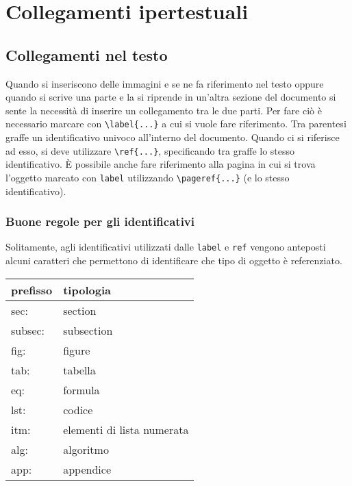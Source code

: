 \section{Collegamenti ipertestuali}

\subsection{Collegamenti nel testo}
Quando si inseriscono delle immagini e se ne fa riferimento nel testo oppure quando si scrive una parte e la si riprende in un'altra sezione del documento si sente la necessità di inserire un collegamento tra le due parti. Per fare ciò è necessario marcare con \verb!\label{...}! a cui si vuole fare riferimento. Tra parentesi graffe un identificativo univoco all'interno del documento. Quando ci si riferisce ad esso, si deve utilizzare \verb!\ref{...}!, specificando tra graffe lo stesso identificativo. È possibile anche fare riferimento alla pagina in cui si trova l'oggetto marcato con \verb!label! utilizzando \verb!\pageref{...}! (e lo stesso identificativo).

\subsubsection{Buone regole per gli identificativi}
Solitamente, agli identificativi utilizzati dalle \verb!label! e \verb!ref! vengono anteposti alcuni caratteri che permettono di identificare che tipo di oggetto è referenziato. 
\begin{table}[]
\centering
\begin{tabular}{ll}
\hline
\textbf{prefisso} & \textbf{tipologia}         \\ \hline
sec:              & section                    \\ \hline
subsec:           & subsection                 \\ \hline
fig:              & figure                     \\ \hline
tab:              & tabella                    \\ \hline
eq:               & formula                    \\ \hline
lst:              & codice                     \\ \hline
itm:              & elementi di lista numerata \\ \hline
alg:              & algoritmo                  \\ \hline
app:              & appendice                  \\ \hline
\end{tabular}
\end{table}


